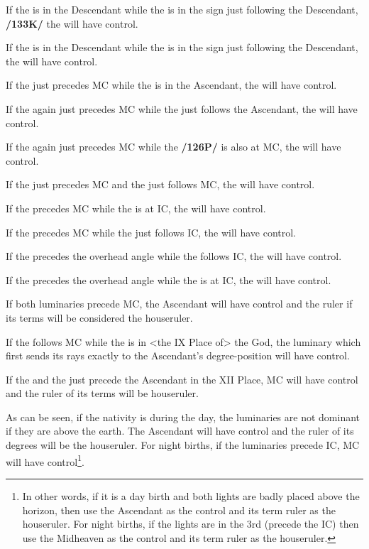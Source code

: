 If the \Sun\xspace is in the Descendant while the \Moon\xspace is in the sign just following the Descendant, \textbf{/133K/} the \Sun\xspace will have control. 

If the \Moon\xspace is in the Descendant while the \Sun\xspace is in the sign just following the Descendant, the \Sun\xspace will have control. 

If the \Sun\xspace just precedes MC while the \Moon\xspace
is in the Ascendant, the \Moon\xspace will have control. 

If the \Sun\xspace again just precedes MC while the \Moon\xspace just follows the Ascendant, the \Moon\xspace will have control. 

If the \Sun\xspace again just precedes MC while the \Moon\xspace \textbf{/126P/} is also at MC, the \Moon\xspace will have control. 

If the \Sun\xspace just precedes MC and the \Moon\xspace just follows MC, the \Moon\xspace will have control. 

If the \Moon\xspace precedes MC while the \Sun\xspace is at IC, the \Sun\xspace will have control. 

If the \Moon\xspace precedes MC while the \Sun\xspace just follows IC, the \Sun\xspace will have control. 

If the \Sun\xspace precedes the overhead angle while the \Moon\xspace follows IC, the \Moon\xspace will have control. 

If the \Sun\xspace precedes the overhead angle while the \Moon\xspace is at IC, the \Moon\xspace will have control. 

If both luminaries precede MC, the Ascendant will have control and the ruler if its terms will be considered the houseruler. 

If the \Moon\xspace follows MC while the \Sun\xspace is in <the IX Place of> the God, the luminary which first sends its rays exactly to the Ascendant’s degree-position will have control. 

If the \Sun\xspace and the \Moon\xspace just precede the Ascendant in the XII Place, MC will have control and the ruler of its terms will be houseruler.

As can be seen, if the nativity is during the day, the luminaries are not dominant if they are above the earth. The Ascendant will have control and the ruler of its degrees will be the houseruler. For night births, if the luminaries precede IC, MC will have control\footnote{In other words, if it is a day birth and both lights are badly placed above the horizon, then use the Ascendant as the control and its term ruler as the houseruler. For night births, if the lights are in the 3rd (precede the IC) then use the Midheaven as the control and its term ruler as the houseruler.}.

